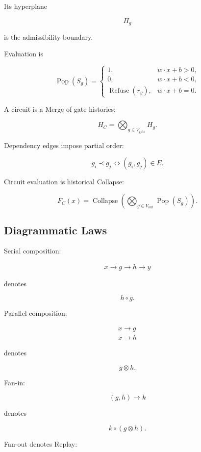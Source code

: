 \documentclass[12pt,oneside]{article}
\theoremstyle{definition}
\theoremstyle{remark}
\begin{document}
Its hyperplane

\[
\Pi_g
\]

is the admissibility boundary.

Evaluation is

\[
\operatorname{Pop}(S_g)
=
\begin{cases}
1,&w\cdot x+b>0,\\
0,&w\cdot x+b<0,\\
\operatorname{Refuse}(r_g),&w\cdot x+b=0.
\end{cases}
\]

A circuit is a Merge of gate histories:

\[
H_C
=
\bigotimes_{g\in V_{\mathrm{gate}}}
H_g.
\]

Dependency edges impose partial order:

\[
g_i\prec g_j
\Longleftrightarrow
(g_i,g_j)\in E.
\]

Circuit evaluation is historical Collapse:

\[
F_C(x)
=
\operatorname{Collapse}
\left(
\bigotimes_{g\in V_{\mathrm{out}}}
\operatorname{Pop}(S_g)
\right).
\]

\subsection*{Diagrammatic Laws}

Serial composition:

\[
\begin{array}{c}
x
\longrightarrow
g
\longrightarrow
h
\longrightarrow
y
\end{array}
\]

denotes

\[
h\circ g.
\]

Parallel composition:

\[
\begin{array}{c}
x
\longrightarrow
g
\\
x
\longrightarrow
h
\end{array}
\]

denotes

\[
g\otimes h.
\]

Fan-in:

\[
(g,h)
\longrightarrow
k
\]

denotes

\[
k\circ(g\otimes h).
\]

Fan-out denotes Replay:
\end{document}
